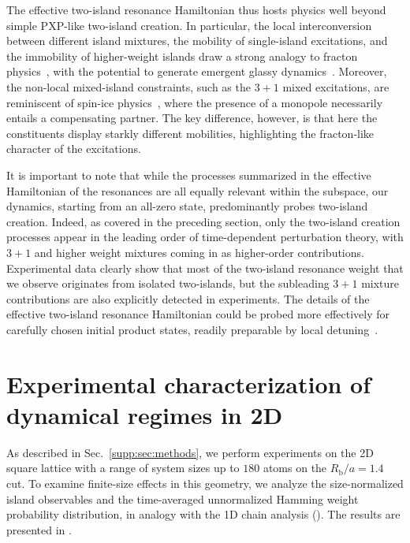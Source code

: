 \documentclass[english,floatfix,twocolumn,showpacs, aps, prx, reprint, superscriptaddress, longbibliography]{revtex4-2}
\begin{document}
The effective two-island resonance Hamiltonian thus hosts physics well beyond simple PXP-like two-island creation. In particular, the local interconversion between different island mixtures, the mobility of single-island excitations, and the immobility of higher-weight islands draw a strong analogy to fracton physics~\cite{Nandkishore:2019}, with the potential to generate emergent glassy dynamics~\cite{Chamon:2005, Hirsbrunner:2025}. Moreover, the non-local mixed-island constraints, such as the $3+1$ mixed excitations, are reminiscent of spin-ice physics~\cite{Castelnovo:2012}, where the presence of a monopole necessarily entails a compensating partner. The key difference, however, is that here the constituents display starkly different mobilities, highlighting the fracton-like character of the excitations.

It is important to note that while the processes summarized in the effective Hamiltonian of the resonances are all equally relevant within the subspace, our dynamics, starting from an all-zero state, predominantly probes two-island creation. Indeed, as covered in the preceding section, only the two-island creation processes appear in the leading order of time-dependent perturbation theory, with $3+1$ and higher weight mixtures coming in as higher-order contributions. Experimental data clearly show that most of the two-island resonance weight that we observe originates from isolated two-islands, but the subleading $3+1$ mixture contributions are also explicitly detected in experiments. The details of the effective two-island resonance Hamiltonian could be probed more effectively for carefully chosen initial product states, readily preparable by local detuning~\cite{aquila:2023, Kornjaca:2024}.



\section{Experimental characterization of dynamical regimes in 2D} 
\label{supp:sec:DPTs_2D_exp}

As described in Sec.~\ref{supp:sec:methods}, we perform experiments on the 2D square lattice with a range of system sizes up to $180$ atoms on the  $R_\mathrm{b} / a = 1.4$ cut. To examine finite-size effects in this geometry, we analyze the size-normalized island observables and the time-averaged unnormalized Hamming weight probability distribution, in analogy with the 1D chain analysis (). The results are presented in . 
\end{document}
